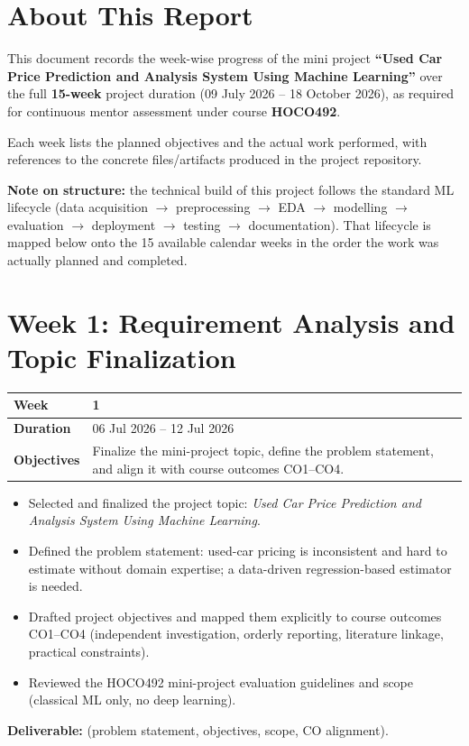 \documentclass[12pt,a4paper]{report}
\newcommand{\weektable}[3]{%
\begin{longtable}{|p{3.6cm}|p{10.5cm}|}
\hline
\textbf{Week} & \textbf{#1} \\
\hline
\textbf{Duration} & #2 \\
\hline
\textbf{Objectives} & #3 \\
\hline
\end{longtable}
}
\begin{document}
\chapter*{About This Report}
\thispagestyle{empty}

This document records the week-wise progress of the mini project
\textbf{``Used Car Price Prediction and Analysis System Using Machine
Learning''} over the full \textbf{15-week} project duration (09 July 2026
-- 18 October 2026), as required for continuous mentor assessment under
course \textbf{HOCO492}.

Each week lists the planned objectives and the actual work performed,
with references to the concrete files/artifacts produced in the project
repository.

\textbf{Note on structure:} the technical build of this project follows
the standard ML lifecycle (data acquisition $\to$ preprocessing $\to$ EDA
$\to$ modelling $\to$ evaluation $\to$ deployment $\to$ testing $\to$
documentation). That lifecycle is mapped below onto the 15 available
calendar weeks in the order the work was actually planned and completed.

\tableofcontents

\clearpage
{}
\setcounter{page}{1}

\chapter{Week 1: Requirement Analysis and Topic Finalization}
\weektable{1}{06 Jul 2026 -- 12 Jul 2026}{Finalize the mini-project topic, define the problem statement, and align it with course outcomes CO1--CO4.}

\begin{itemize}[nosep]
    \item Selected and finalized the project topic: \textit{Used Car Price Prediction and Analysis System Using Machine Learning}.
    \item Defined the problem statement: used-car pricing is inconsistent and hard to estimate without domain expertise; a data-driven regression-based estimator is needed.
    \item Drafted project objectives and mapped them explicitly to course outcomes CO1--CO4 (independent investigation, orderly reporting, literature linkage, practical constraints).
    \item Reviewed the HOCO492 mini-project evaluation guidelines and scope (classical ML only, no deep learning).
\end{itemize}
\textbf{Deliverable:}  (problem statement, objectives, scope, CO alignment).
\end{document}
